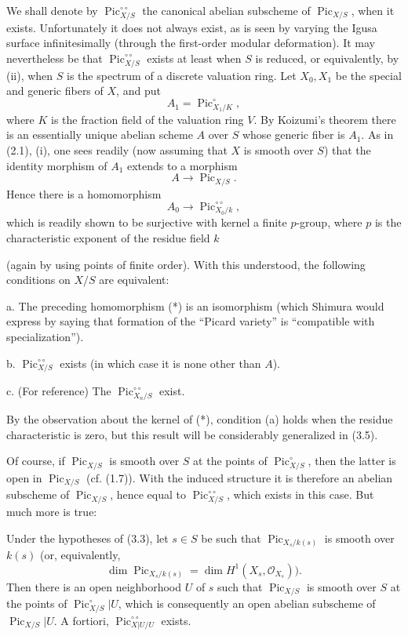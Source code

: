  We shall denote by
$\operatorname{Pic}_{X/S}^{\circ\circ}$ the canonical abelian subscheme of
$\operatorname{Pic}_{X/S}$, when it exists. Unfortunately it does not always
exist, as is seen by varying the Igusa surface infinitesimally (through the
first-order modular deformation). It may nevertheless be that
$\operatorname{Pic}_{X/S}^{\circ\circ}$ exists at least when $S$ is reduced,
or equivalently, by (ii), when $S$ is the spectrum of a discrete valuation
ring. Let $X_0,X_1$ be the special and generic fibers of $X$, and put
\[
A_1=\operatorname{Pic}_{X_1/K}^\circ,
\]
where $K$ is the fraction field of the valuation ring $V$. By Koizumi's
theorem there is an essentially unique abelian scheme $A$ over $S$ whose
generic fiber is $A_1$. As in (2.1), (i), one sees readily (now assuming that
$X$ is smooth over $S$) that the identity morphism of $A_1$ extends to a
morphism
\[
A\longrightarrow\operatorname{Pic}_{X/S}.
\]
Hence there is a homomorphism
\[
\tag{*}A_0\longrightarrow\operatorname{Pic}_{X_0/k}^{\circ\circ},
\]
which is readily shown to be surjective with kernel a finite $p$-group, where
$p$ is the characteristic exponent of the residue field $k$

(again by using points of finite order). With this understood, the following
conditions on $X/S$ are equivalent:

\medskip
\noindent a. The preceding homomorphism (*) is an isomorphism (which Shimura
would express by saying that formation of the “Picard variety” is “compatible
with specialization”).

\noindent b. $\operatorname{Pic}_{X/S}^{\circ\circ}$ exists (in which case it
is none other than $A$).

\noindent c. (For reference) The
$\operatorname{Pic}_{X_n/S}^{\circ\circ}$ exist.

By the observation about the kernel of (*), condition (a) holds when the
residue characteristic is zero, but this result will be considerably
generalized in (3.5).

Of course, if $\operatorname{Pic}_{X/S}$ is smooth over $S$ at the points of
$\operatorname{Pic}_{X/S}^\circ$, then the latter is open in
$\operatorname{Pic}_{X/S}$ (cf. (1.7)). With the induced structure it is
therefore an abelian subscheme of $\operatorname{Pic}_{X/S}$, hence equal to
$\operatorname{Pic}_{X/S}^{\circ\circ}$, which exists in this case. But much
more is true:

 Under the hypotheses of (3.3), let $s\in S$ be such that
$\operatorname{Pic}_{X_s/k(s)}$ is smooth over $k(s)$ (or, equivalently,
\[
\dim\operatorname{Pic}_{X_s/k(s)}=\dim H^1(X_s,\mathcal O_{X_s})).
\]
Then there is an open neighborhood $U$ of $s$ such that
$\operatorname{Pic}_{X/S}$ is smooth over $S$ at the points of
$\operatorname{Pic}_{X/S}^\circ|U$, which is consequently an open abelian
subscheme of $\operatorname{Pic}_{X/S}|U$. A fortiori,
$\operatorname{Pic}_{X|U/U}^{\circ\circ}$ exists.

